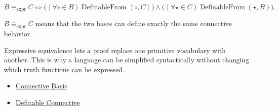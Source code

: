 \begin{remark*}
\[
B\equiv_{\mathrm{expr}} C
\Longleftrightarrow
\bigl((\forall\circ\in B)\operatorname{DefinableFrom}(\circ,C)\bigr)
\land
\bigl((\forall\star\in C)\operatorname{DefinableFrom}(\star,B)\bigr).
\]
\end{remark*}

\begin{remark*}
\(B\equiv_{\mathrm{expr}} C\) means that the two bases can define exactly the
same connective behavior.
\end{remark*}

\begin{remark*}[Interpretation]
Expressive equivalence lets a proof replace one primitive vocabulary with
another. This is why a language can be simplified syntactically without changing
which truth functions can be expressed.
\end{remark*}

\begin{dependencies}
\begin{itemize}
  \item \hyperref[def:connective-basis-propositional-logic]{Connective Basis}
  \item \hyperref[def:definable-connective-propositional-logic]{Definable Connective}
\end{itemize}
\end{dependencies}
